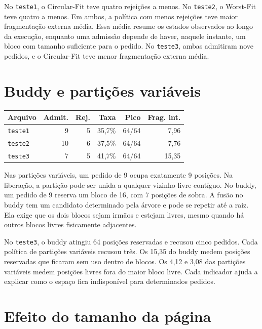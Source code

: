 \documentclass[11pt,a4paper]{article}
\newcommand{\arquivo}[1]{\texttt{#1}}
\begin{document}
No \arquivo{teste1}, o Circular-Fit teve quatro rejeições a menos. No
\arquivo{teste2}, o Worst-Fit teve quatro a menos. Em ambos, a política
com menos rejeições teve maior fragmentação externa média. Essa média
resume os estados observados ao longo da execução, enquanto uma admissão
depende de haver, naquele instante, um bloco com tamanho suficiente para
o pedido. No \arquivo{teste3}, ambas admitiram nove pedidos, e o
Circular-Fit teve menor fragmentação externa média.

\section{Buddy e partições variáveis}

\begin{center}
\label{tab:buddy}
\small
\begin{tabular}{@{}lrrrrr@{}}
\toprule
Arquivo & Admit. & Rej. & Taxa & Pico & Frag. int. \\
\midrule
\arquivo{teste1} &  9 & 5 & 35,7\% & 64/64 & 7,96 \\
\arquivo{teste2} & 10 & 6 & 37,5\% & 64/64 & 7,76 \\
\arquivo{teste3} &  7 & 5 & 41,7\% & 64/64 & 15,35 \\
\bottomrule
\end{tabular}
\end{center}

Nas partições variáveis, um pedido de 9 ocupa exatamente 9 posições.
Na liberação, a partição pode ser unida a qualquer vizinho livre contíguo.
No buddy, um pedido de 9 reserva um bloco de 16, com 7 posições de sobra.
A fusão no buddy tem um candidato determinado pela árvore e pode se
repetir até a raiz. Ela exige que os dois blocos sejam irmãos e estejam
livres, mesmo quando há outros blocos livres fisicamente adjacentes.

No \arquivo{teste3}, o buddy atingiu 64 posições reservadas e recusou cinco
pedidos. Cada política de partições variáveis recusou três. Os 15,35 do
buddy medem posições reservadas que ficaram sem uso dentro de blocos.
Os 4,12 e 3,08 das partições variáveis medem posições livres fora do maior
bloco livre. Cada indicador ajuda a explicar como o espaço fica
indisponível para determinados pedidos.

\clearpage

\section{Efeito do tamanho da página}
\end{document}
